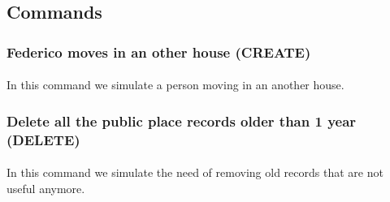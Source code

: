 \documentclass[a4paper,12pt]{article}
\begin{document}
\subsection{Commands}
\subsubsection{Federico moves in an other house (CREATE)}
\paragraph{} In this command we simulate a person moving in an another house.
\begin{center}
\end{center}

\subsubsection{Delete all the public place records older than 1 year (DELETE) }
\paragraph{} In this command we simulate the need of removing old records that are not useful anymore.
\begin{center}
\end{center}
\end{document}
